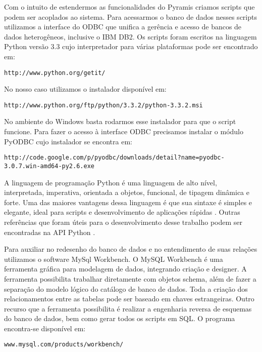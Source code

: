 Com o intuito de estendermos as funcionalidades do Pyramis criamos scripts que podem ser acoplados ao sistema. Para acessarmos o banco de dados nesses scripts utilizamos a interface do ODBC que unifica a gerência e acesso de bancos de dados heterogêneos, inclusive o IBM DB2. Os scripts foram escritos na linguagem Python versão 3.3 cujo interpretador para várias plataformas pode ser encontrado em:\\
\begin{verbatim}
http://www.python.org/getit/
\end{verbatim}
No nosso caso utilizamos o instalador disponível em:\\
\begin{verbatim}
http://www.python.org/ftp/python/3.3.2/python-3.3.2.msi
\end{verbatim}
No ambiente do Windows basta rodarmos esse instalador para que o script funcione. Para fazer o acesso à interface ODBC precisamos instalar o módulo PyODBC cujo instalador se encontra em:\\
\begin{verbatim}
http://code.google.com/p/pyodbc/downloads/detail?name=pyodbc-3.0.7.win-amd64-py2.6.exe
\end{verbatim}
A linguagem de programação Python é uma linguagem de alto nível, interpretada, imperativa, orientada a objetos, funcional, de tipagem dinâmica e forte. Uma das maiores vantagens dessa linguagem é que sua sintaxe é simples e elegante, ideal para scripts e desenvolvimento de aplicações rápidas \cite{Martelli2013}. Outras referências que foram úteis para o desenvolvimento desse trabalho podem ser encontradas na API Python \cite{PythonAPI}.

Para auxiliar no redesenho do banco de dados e no entendimento de suas relações utilizamos o software MySql Workbench\textcopyright. O MySQL Workbench é uma ferramenta gráfica para modelagem de dados, integrando criação e designer. A ferramenta possibilita trabalhar diretamente com objetos schema, além de fazer a separação do modelo lógico do catálogo de banco de dados. Toda a criação dos relacionamentos entre as tabelas pode ser baseado em chaves estrangeiras. Outro recurso que a ferramenta possibilita é realizar a engenharia reversa de esquemas do banco de dados, bem como gerar todos os scripts em SQL. O programa encontra-se disponível em:\\
\begin{verbatim}
www.mysql.com/products/workbench/
\end{verbatim}


